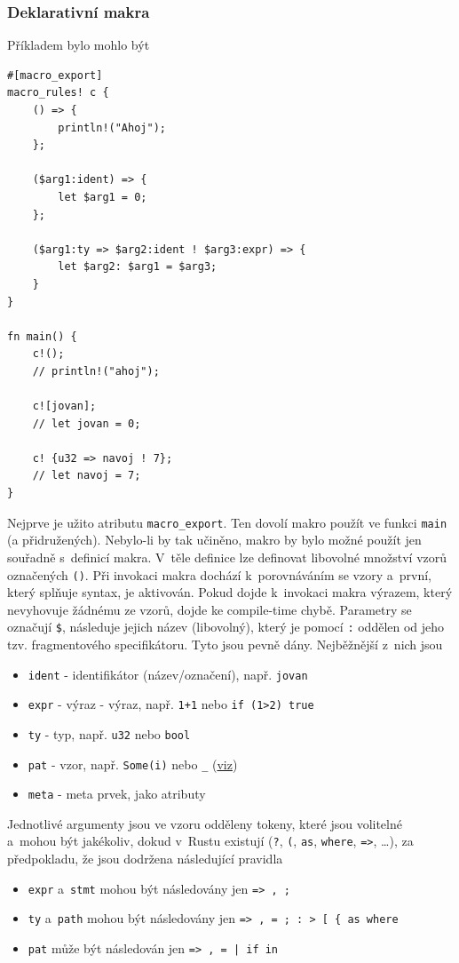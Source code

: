 \documentclass[a4paper, 12pt]{article} %
\newcommand{\rust}[1]{\texttt{#1}}
\begin{document}
        \subsubsection*{Deklarativní makra}
            Příkladem bylo mohlo být
            \begin{verbatim}
#[macro_export]
macro_rules! c {
    () => {
        println!("Ahoj");
    };

    ($arg1:ident) => {
        let $arg1 = 0;
    };
    
    ($arg1:ty => $arg2:ident ! $arg3:expr) => {
        let $arg2: $arg1 = $arg3;
    }
}

fn main() {
    c!();
    // println!("ahoj");
    
    c![jovan];
    // let jovan = 0;
    
    c! {u32 => navoj ! 7};
    // let navoj = 7;
}
            \end{verbatim}

            Nejprve je užito atributu \rust{macro_export}. Ten dovolí makro použít ve funkci \rust{main} (a přidružených). Nebylo-li by tak učiněno, makro by bylo možné použít jen souřadně s~definicí makra. V~těle definice lze definovat libovolné množství vzorů označených \rust{()}. Při invokaci makra dochází k~porovnáváním se vzory a~první, který splňuje syntax, je aktivován. Pokud dojde k~invokaci makra výrazem, který nevyhovuje žádnému ze vzorů, dojde ke compile-time chybě. Parametry se označují \texttt{\$}, následuje jejich název (libovolný), který je pomocí \texttt{:} oddělen od jeho tzv. fragmentového specifikátoru. Tyto jsou pevně dány. Nejběžnější z~nich jsou
            \begin{itemize}
                \item \rust{ident} - identifikátor (název/označení), např. \rust{jovan}
                \item \rust{expr}  - výraz - výraz, např. \rust{1+1} nebo \rust{if (1>2) {true}}
                \item \rust{ty}    - typ, např. \rust{u32} nebo \rust{bool}
                \item \rust{pat}   - vzor, např. \rust{Some(i)} nebo \rust{_} (\hyperlink{_}{viz})
                \item \rust{meta}  - meta prvek, jako atributy
            \end{itemize}\cite{makra}
            
            Jednotlivé argumenty jsou ve vzoru odděleny tokeny, které jsou volitelné a~mohou být jakékoliv, dokud v~Rustu existují (\rust{?}, \rust{(}, \rust{as}, \rust{where}, \rust{=>}, \dots), za předpokladu, že jsou dodržena následující pravidla
            \begin{itemize}
                \item \rust{expr} a~\rust{stmt} mohou být následovány jen \texttt{=> , ;}
                \item \rust{ty} a~\rust{path} mohou být následovány jen \texttt{=> , = ; : > [ \{ as where}
                \item \rust{pat} může být následován jen \texttt{=> , = | if in}
            \end{itemize}
            
\end{document}

